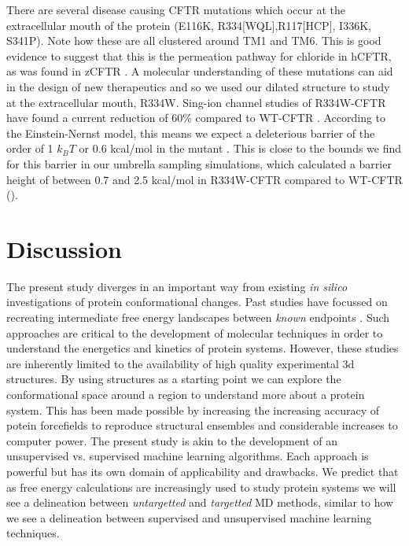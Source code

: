 There are several disease causing CFTR mutations which occur at the extracellular mouth of the protein (E116K, R334[WQL],R117[HCP], I336K, S341P)\cite{cftr2}. Note how these are all clustered around TM1 and TM6. This is good evidence to suggest that this is the permeation pathway for chloride in hCFTR, as was found in zCFTR \cite{farkas2020}. A molecular understanding of these mutations can aid in the design of new therapeutics and so we used our dilated structure to study at the extracellular mouth, R334W. Sing-ion channel studies of R334W-CFTR have found a current reduction of 60\% compared to WT-CFTR \cite{gong2004}. According to the Einstein-Nernst model, this means we expect a deleterious barrier of the order of 1 $k_B T$ or 0.6 kcal/mol in the mutant \cite{}. This is close to the bounds we find for this barrier in our umbrella sampling simulations, which calculated a barrier height of between 0.7 and 2.5 kcal/mol in R334W-CFTR compared to WT-CFTR (). 

\section{Discussion}

The present study diverges in an important way from existing \textit{in silico} investigations of protein conformational changes. Past studies have focussed on recreating intermediate free energy landscapes between \textit{known} endpoints \cite{lev2020, bergh2021, moradi2015}. Such approaches are critical to the development of molecular techniques in order to understand the energetics and kinetics of protein systems. However, these studies are inherently limited to the availability of high quality experimental 3d structures. By using structures as a starting point we can explore the conformational space around a region to understand more about a protein system. This has been made possible by increasing the increasing accuracy of potein forcefields to reproduce structural ensembles \cite{huang2016} and considerable increases to computer power. The present study is akin to the development of an unsupervised vs. supervised machine learning algorithms. Each approach is powerful but has its own domain of applicability and drawbacks. 
We predict that as free energy calculations are increasingly used to study protein systems we will see a delineation between \textit{untargetted} and \textit{targetted} MD methods, similar to how we see a delineation between supervised and unsupervised machine learning techniques.

